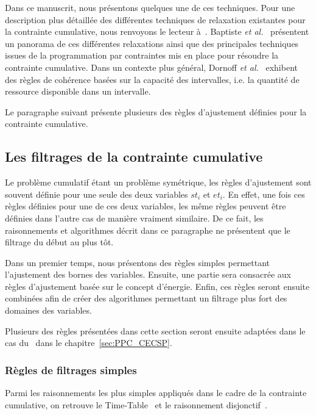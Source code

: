 Dans ce manuscrit, nous présentons quelques une de ces
techniques. Pour une description plus détaillée des différentes
techniques de relaxation existantes pour la contrainte cumulative,
nous renvoyons le lecteur à~\cite{BLPN,DHP}. 
Baptiste {\it et al.}~\cite{BLPN} présentent un panorama de ces
différentes relaxations ainsi que des principales techniques issues de
la programmation par contraintes mis en place pour résoudre la
contrainte cumulative. Dans un contexte plus général, Dornoff {\it et
al.}~\cite{DHP} exhibent des règles de cohérence basées sur la
capacité des intervalles, i.e. la quantité de ressource disponible
dans un intervalle.

Le paragraphe suivant présente plusieurs des règles d'ajustement
définies pour la contrainte cumulative. 


\subsection{Les filtrages de la contrainte cumulative}
\label{sec:cumu_propag}

Le problème cumulatif étant un problème symétrique, les règles
d'ajustement sont souvent définie pour une seule des deux variables
$st_i$ et $et_i$. En effet, une fois ces règles définies pour une de
ces deux variables, les même règles peuvent être définies dans l'autre
cas de manière vraiment similaire. De ce fait, les raisonnements et
algorithmes décrit dans ce paragraphe ne présentent que le filtrage du
début au plus tôt.

Dans un premier temps, nous présentons des règles simples permettant
l'ajustement des bornes des variables. Ensuite, une partie sera
consacrée aux règles d'ajustement basée sur le concept
d'énergie. Enfin, ces règles seront ensuite combinées afin de créer
des algorithmes permettant un filtrage plus fort des domaines des
variables.

Plusieurs des règles présentées dans cette section seront ensuite
adaptées dans le cas du \CECSP~dans le chapitre~\ref{sec:PPC_CECSP}.

\subsubsection{Règles de filtrages simples}

Parmi les raisonnements les plus simples appliqués dans le cadre de la
contrainte cumulative, on retrouve le Time-Table~\cite{TTLah} et le
raisonnement disjonctif~\cite{BLPN}.  

